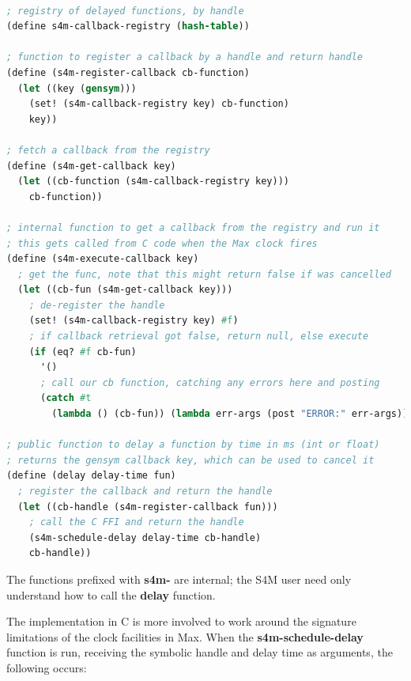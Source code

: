 \documentclass[acmsmall]{acmart}
\begin{document}
\begin{lstlisting}[language=lisp]

; registry of delayed functions, by handle 
(define s4m-callback-registry (hash-table))

; function to register a callback by a handle and return handle
(define (s4m-register-callback cb-function)
  (let ((key (gensym)))
    (set! (s4m-callback-registry key) cb-function)
    key))

; fetch a callback from the registry 
(define (s4m-get-callback key)
  (let ((cb-function (s4m-callback-registry key)))
    cb-function))

; internal function to get a callback from the registry and run it
; this gets called from C code when the Max clock fires
(define (s4m-execute-callback key)
  ; get the func, note that this might return false if was cancelled
  (let ((cb-fun (s4m-get-callback key)))
    ; de-register the handle
    (set! (s4m-callback-registry key) #f)
    ; if callback retrieval got false, return null, else execute 
    (if (eq? #f cb-fun) 
      '()
      ; call our cb function, catching any errors here and posting
      (catch #t 
        (lambda () (cb-fun)) (lambda err-args (post "ERROR:" err-args))))))

; public function to delay a function by time in ms (int or float)
; returns the gensym callback key, which can be used to cancel it
(define (delay delay-time fun)
  ; register the callback and return the handle
  (let ((cb-handle (s4m-register-callback fun)))
    ; call the C FFI and return the handle
    (s4m-schedule-delay delay-time cb-handle)
    cb-handle))

\end{lstlisting}

The functions prefixed with \textbf{s4m-} are internal; the S4M user 
need only understand how to call the \textbf{delay} function.

The implementation in C is more involved to work around the signature 
limitations of the clock facilities in Max.
When the \textbf{s4m-schedule-delay} function is run, receiving the symbolic handle
and delay time as arguments, the following occurs:
\end{document}
